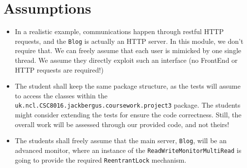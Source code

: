 \documentclass{article}
\begin{document}
	
	\section*{Assumptions}
	\begin{itemize}
		\item In a realistic example, communications happen through restful HTTP requests, and the \texttt{Blog} is actually an HTTP server. In this module, we don't require that. We can freely assume that each user is mimicked by one single
		thread. We assume they directly exploit such an interface (no
		FrontEnd or HTTP requests are required!)

\item The student shall keep the same package structure, as the tests will assume to access the classes within the \texttt{uk.ncl.CSC8016.jackbergus.coursework.project3} package. The students might consider extending the tests for ensure the code correctness. Still, the overall work will be assessed through our provided code, and not theirs!

		\item The students shall freely assume that the main server, \texttt{Blog}, will be an advanced monitor, where an instance of the \texttt{ReadWriteMonitorMultiRead} is going to provide the required \texttt{ReentrantLock} mechanism. 


\end{itemize}
\end{document}
